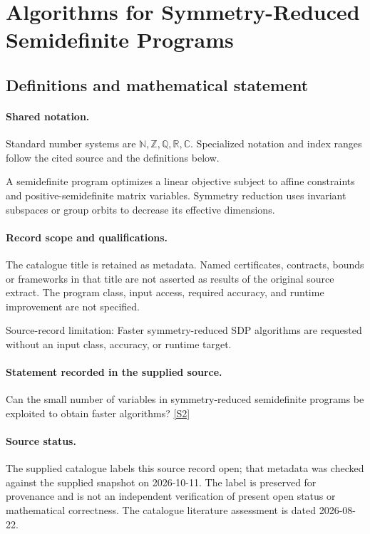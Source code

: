 \documentclass[11pt]{article}
\newcommand{\sref}[2]{\hyperlink{source:#1:#2}{[S#2]}}
\begin{document}
\section{Algorithms for Symmetry-Reduced Semidefinite Programs}\label{statement}

\subsection{Definitions and mathematical statement}

\paragraph{Shared notation.}Standard number systems are $\mathbb N,\mathbb Z,\mathbb Q,\mathbb R,\mathbb C$. Specialized notation and index ranges follow the cited source and the definitions below.


A semidefinite program optimizes a linear objective subject to affine constraints and positive-semidefinite matrix variables. Symmetry reduction uses invariant subspaces or group orbits to decrease its effective dimensions.
\paragraph{Record scope and qualifications.}
The catalogue title is retained as metadata. Named certificates, contracts, bounds or frameworks in that title are not asserted as results of the original source extract.
The program class, input access, required accuracy, and runtime improvement are not specified.

Source-record limitation: Faster symmetry-reduced SDP algorithms are requested without an input class, accuracy, or runtime target.
\paragraph{Statement recorded in the supplied source.}
Can the small number of variables in symmetry-reduced semidefinite programs be exploited to obtain faster algorithms? \sref{statement}{2}
\paragraph{Source status.}
The supplied catalogue labels this source record open; that metadata was checked against the supplied snapshot on 2026-10-11. The label is preserved for provenance and is not an independent verification of present open status or mathematical correctness. The catalogue literature assessment is dated 2026-08-22.
\end{document}
